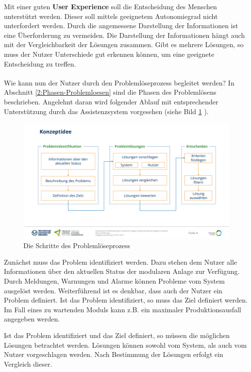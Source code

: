 Mit einer guten \textbf{User Experience} soll die Entscheidung des Menschen unterstützt werden. Dieser soll mittels geeignetem Autonomiegrad nicht unterfordert werden. Durch die angemessene Darstellung der Informationen ist eine Überforderung zu vermeiden. Die Darstellung der Informationen hängt auch mit der Vergleichbarkeit der Lösungen zusammen. Gibt es mehrere Lösungen, so muss der Nutzer Unterschiede gut erkennen können, um eine geeignete Entscheidung zu treffen.
\\ \\
Wie kann nun der Nutzer durch den Problemlöseprozess begleitet werden? In Abschnitt \ref{2:Phasen-Problemloesen} sind die Phasen des Problemlösens beschrieben. Angelehnt daran wird folgender Ablauf mit entsprechender Unterstützung durch das Assistenzsystem vorgesehen (siehe Bild \ref{pic:Konzeptidee} ).
\begin{figure}[htbp]
\centering
\includegraphics[scale=0.45]{DA_files/Bilder/Konzept/Konzeptidee.pdf}
\caption{Die Schritte des Problemlöseprozess}
\label{pic:Konzeptidee}
\end{figure}

Zunächst muss das Problem identifiziert werden. Dazu stehen dem Nutzer alle Informationen über den aktuellen Status der modularen Anlage zur Verfügung. Durch Meldungen, Warnungen und Alarme können Probleme vom System ausgelöst werden. Weiterführend ist es denkbar, dass auch der Nutzer ein Problem definiert. Ist das Problem identifiziert, so muss das Ziel definiert werden. Im Fall eines zu wartenden Moduls kann z.B. ein maximaler Produktionsausfall angegeben werden.

Ist das Problem identifiziert und das Ziel definiert, so müssen die möglichen Lösungen betrachtet werden. Lösungen können sowohl vom System, als auch vom Nutzer vorgeschlagen werden. Nach Bestimmung der Lösungen erfolgt ein Vergleich dieser.

